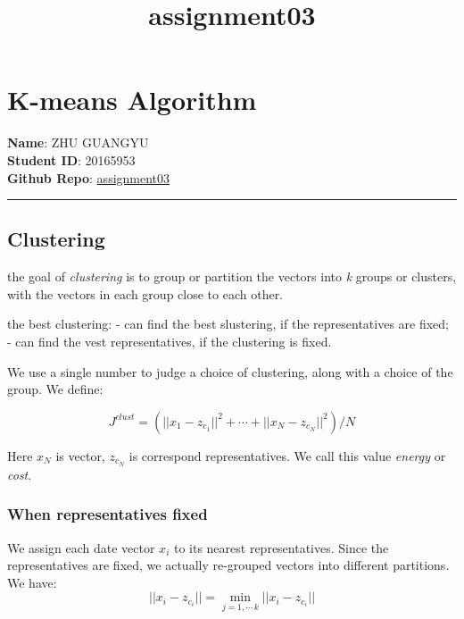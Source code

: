 \documentclass[11pt]{article}
\title{assignment03}
\begin{document}
    
    
    \maketitle
    
    

    
    \section{K-means Algorithm}\label{k-means-algorithm}

\textbf{Name}: ZHU GUANGYU\\
\textbf{Student ID}: 20165953\\
\textbf{Github Repo}:
\href{https://github.com/z1ggy-o/cv_assignment/tree/master/assignment03}{assignment03}

\begin{center}\rule{0.5\linewidth}{\linethickness}\end{center}

\subsection{Clustering}\label{clustering}

the goal of \emph{clustering} is to group or partition the vectors into
\emph{k} groups or clusters, with the vectors in each group close to
each other.

the best clustering: - can find the best slustering, if the
representatives are fixed; - can find the vest representatives, if the
clustering is fixed.

We use a single number to judge a choice of clustering, along with a
choice of the group. We define:

\[
J^{clust}=(||x_{1}-z_{c_{1}}||^{2}+ \cdots +||x_{N}-z_{c_{N}}||^{2})/N
\]

Here \(x_{N}\) is vector, \(z_{c_{N}}\) is correspond representatives.
We call this value \emph{energy} or \emph{cost}.

\subsubsection{When representatives
fixed}\label{when-representatives-fixed}

We assign each date vector \(x_{i}\) to its nearest representatives.
Since the representatives are fixed, we actually re-grouped vectors into
different partitions. We have:
\[ ||x_{i}-z_{c_{i}}|| = \min_{j=1,\cdots\,k}||x_{i}-z_{c_{i}}|| \]
\end{document}
